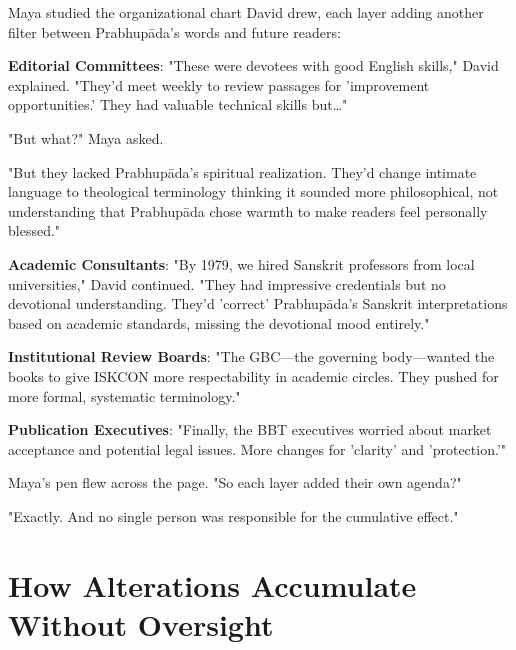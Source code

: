 \documentclass[11pt,twoside]{book}
\begin{document}
\begin{itemize}
Maya studied the organizational chart David drew, each layer adding another filter between Prabhupāda's words and future readers:

\textbf{\textbf{Editorial Committees}}: "These were devotees with good English skills," David explained. "They'd meet weekly to review passages for 'improvement opportunities.' They had valuable technical skills but\ldots{}"

"But what?" Maya asked.

"But they lacked Prabhupāda's spiritual realization. They'd change intimate language to theological terminology thinking it sounded more philosophical, not understanding that Prabhupāda chose warmth to make readers feel personally blessed."

\textbf{\textbf{Academic Consultants}}: "By 1979, we hired Sanskrit professors from local universities," David continued. "They had impressive credentials but no devotional understanding. They'd 'correct' Prabhupāda's Sanskrit interpretations based on academic standards, missing the devotional mood entirely."

\textbf{\textbf{Institutional Review Boards}}: "The GBC—the governing body—wanted the books to give ISKCON more respectability in academic circles. They pushed for more formal, systematic terminology."

\textbf{\textbf{Publication Executives}}: "Finally, the BBT executives worried about market acceptance and potential legal issues. More changes for 'clarity' and 'protection.'"

Maya's pen flew across the page. "So each layer added their own agenda?"

"Exactly. And no single person was responsible for the cumulative effect."
\end{itemize}
\section*{How Alterations Accumulate Without Oversight}
\label{sec:org8295957}
\end{document}
